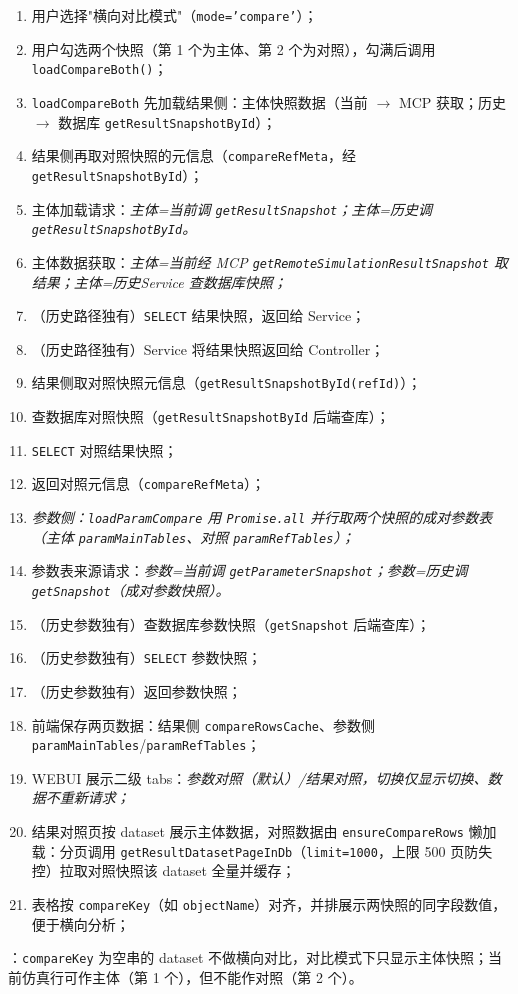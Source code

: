 \begin{enumerate}[label=\arabic*)]
	\item 用户选择"横向对比模式"（\texttt{mode='compare'}）；
	\item 用户勾选两个快照（第 1 个为主体、第 2 个为对照），勾满后调用 \texttt{loadCompareBoth()}；
	\item \texttt{loadCompareBoth} 先加载结果侧：主体快照数据（当前 $\rightarrow$ MCP 获取；历史 $\rightarrow$ 数据库 \texttt{getResultSnapshotById}）；
	\item 结果侧再取对照快照的元信息（\texttt{compareRefMeta}，经 \texttt{getResultSnapshotById}）；
	\item 主体加载请求：\it{主体=当前}调 \texttt{getResultSnapshot}；\it{主体=历史}调 \texttt{getResultSnapshotById}。
	\item 主体数据获取：\it{主体=当前}经 MCP \texttt{getRemoteSimulationResultSnapshot} 取结果；\it{主体=历史}Service 查数据库快照；
	\item（历史路径独有）\texttt{SELECT} 结果快照，返回给 Service；
	\item（历史路径独有）Service 将结果快照返回给 Controller；
	\item 结果侧取对照快照元信息（\texttt{getResultSnapshotById(refId)}）；
	\item 查数据库对照快照（\texttt{getResultSnapshotById} 后端查库）；
	\item \texttt{SELECT} 对照结果快照；
	\item 返回对照元信息（\texttt{compareRefMeta}）；
	\item \it{参数侧}：\texttt{loadParamCompare} 用 \texttt{Promise.all} \it{并行}取两个快照的\it{成对参数表}（主体 \texttt{paramMainTables}、对照 \texttt{paramRefTables}）；
	\item 参数表来源请求：\it{参数=当前}调 \texttt{getParameterSnapshot}；\it{参数=历史}调 \texttt{getSnapshot}（成对参数快照）。
	\item（历史参数独有）查数据库参数快照（\texttt{getSnapshot} 后端查库）；
	\item（历史参数独有）\texttt{SELECT} 参数快照；
	\item（历史参数独有）返回参数快照；
	\item 前端保存两页数据：结果侧 \texttt{compareRowsCache}、参数侧 \texttt{paramMainTables}/\texttt{paramRefTables}；
	\item WEBUI 展示二级 tabs：\it{参数对照}（默认）/\it{结果对照}，切换仅显示切换、数据不重新请求；
	\item 结果对照页按 dataset 展示主体数据，对照数据由 \texttt{ensureCompareRows} 懒加载：分页调用 \texttt{getResultDatasetPageInDb}（\texttt{limit=1000}，上限 500 页防失控）拉取对照快照该 dataset 全量并缓存；
	\item 表格按 \texttt{compareKey}（如 \texttt{objectName}）对齐，并排展示两快照的同字段数值，便于横向分析；
\end{enumerate}
：\texttt{compareKey} 为空串的 dataset 不做横向对比，对比模式下只显示主体快照；当前仿真行可作主体（第 1 个），但不能作对照（第 2 个）。
\newpage
